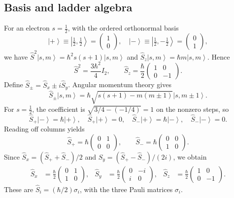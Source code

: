 \documentclass[11pt,a4paper]{article}
\theoremstyle{definition}
\newcommand{\ket}[1]{\left|#1\right\rangle}
\begin{document}
\subsection{Basis and ladder algebra}
For an electron \(s=\tfrac12\), with the ordered orthonormal basis
\begin{equation}
\ket+\equiv\ket{\tfrac12,\tfrac12}=\begin{pmatrix}1\\0\end{pmatrix},\quad
\ket-\equiv\ket{\tfrac12,-\tfrac12}=\begin{pmatrix}0\\1\end{pmatrix},
\end{equation}
we have \(\hat S^2\ket{s,m}=\hbar^2s(s+1)\ket{s,m}\) and \(\hat S_z\ket{s,m}=\hbar m\ket{s,m}\). Hence
\begin{equation}
\hat S^2=\frac{3\hbar^2}{4}I_2,\qquad
\hat S_z=\frac\hbar2\begin{pmatrix}1&0\\0&-1\end{pmatrix}.
\end{equation}
Define \(\hat S_\pm=\hat S_x\pm i\hat S_y\). Angular momentum theory gives
\begin{equation}
\hat S_\pm\ket{s,m}=\hbar\sqrt{s(s+1)-m(m\pm1)}\ket{s,m\pm1}.
\end{equation}
For \(s=\frac12\), the coefficient is \(\sqrt{3/4-(-1/4)}=1\) on the nonzero steps, so
\begin{equation}
\hat S_+\ket-=\hbar\ket+ ,\quad \hat S_+\ket+=0,\quad
\hat S_-\ket+=\hbar\ket-,\quad \hat S_-\ket-=0.
\end{equation}
Reading off columns yields
\begin{equation}
\hat S_+=\hbar\begin{pmatrix}0&1\\0&0\end{pmatrix},\qquad
\hat S_-=\hbar\begin{pmatrix}0&0\\1&0\end{pmatrix}.
\end{equation}
Since \(\hat S_x=(\hat S_++\hat S_-)/2\) and \(\hat S_y=(\hat S_+-\hat S_-)/(2i)\), we obtain
\begin{equation}
\boxed{\begin{aligned}
\hat S_x&=\frac\hbar2\begin{pmatrix}0&1\\1&0\end{pmatrix},&
\hat S_y&=\frac\hbar2\begin{pmatrix}0&-i\\i&0\end{pmatrix},&
\hat S_z&=\frac\hbar2\begin{pmatrix}1&0\\0&-1\end{pmatrix}.
\end{aligned}}
\label{eq:spinmats}
\end{equation}
These are \(\hat S_i=(\hbar/2)\sigma_i\), with the three Pauli matrices \(\sigma_i\).
\end{document}
